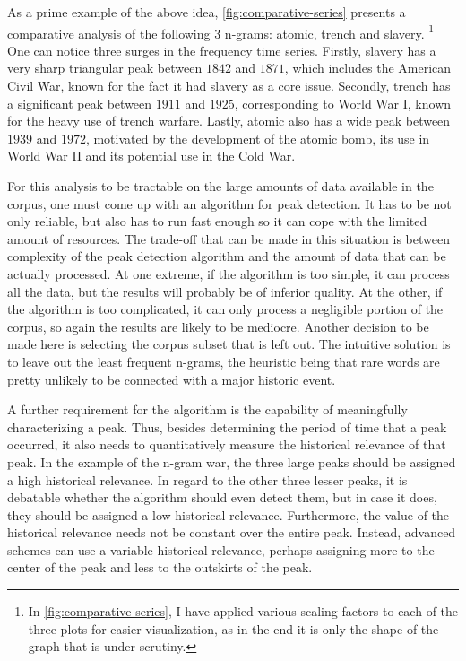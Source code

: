 As a prime example of the above idea, \autoref{fig:comparative-series} presents a comparative analysis of the following 3 n-grams: atomic, trench and slavery. \footnote{In \autoref{fig:comparative-series}, I have applied various scaling factors to each of the three plots for easier visualization, as in the end it is only the shape of the graph that is under scrutiny.} One can notice three surges in the frequency time series. Firstly, slavery has a very sharp triangular peak between $1842$ and $1871$, which includes the American Civil War, known for the fact it had slavery as a core issue. Secondly, trench has a significant peak between $1911$ and $1925$, corresponding to World War I, known for the heavy use of trench warfare. Lastly, atomic also has a wide peak between $1939$ and $1972$, motivated by the development of the atomic bomb, its use in World War II and its potential use in the Cold War.

For this analysis to be tractable on the large amounts of data available in the corpus, one must come up with an algorithm for peak detection. It has to be not only reliable, but also has to run fast enough so it can cope with the limited amount of resources. The trade-off that can be made in this situation is between complexity of the peak detection algorithm and the amount of data that can be actually processed. At one extreme, if the algorithm is too simple, it can process all the data, but the results will probably be of inferior quality. At the other, if the algorithm is too complicated, it can only process a negligible portion of the corpus, so again the results are likely to be mediocre. Another decision to be made here is selecting the corpus subset that is left out. The intuitive solution is to leave out the least frequent n-grams, the heuristic being that rare words are pretty unlikely to be connected with a major historic event.

A further requirement for the algorithm is the capability of meaningfully characterizing a peak. Thus, besides determining the period of time that a peak occurred, it also needs to quantitatively measure the historical relevance of that peak. In the example of the n-gram war, the three large peaks should be assigned a high historical relevance. In regard to the other three lesser peaks, it is debatable whether the algorithm should even detect them, but in case it does, they should be assigned a low historical relevance. Furthermore, the value of the historical relevance needs not be constant over the entire peak. Instead, advanced schemes can use a variable historical relevance, perhaps assigning more to the center of the peak and less to the outskirts of the peak.

